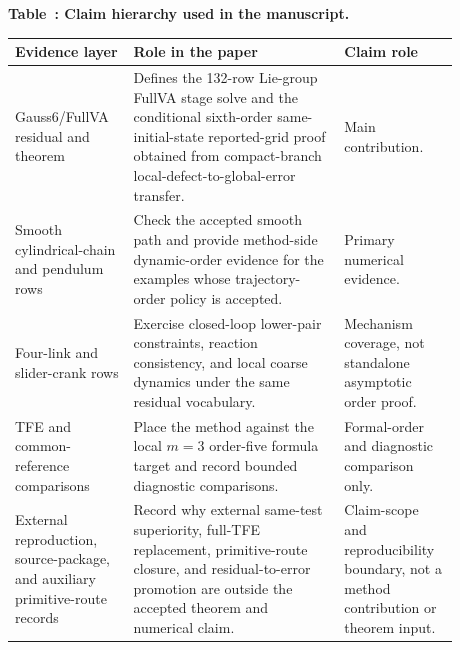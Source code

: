 \documentclass[preprint,12pt]{elsarticle}
\newcommand{\tfe}{TFE}
\begin{document}
\begin{center}
\label{tab:intro-claim-hierarchy}
\small
\textbf{Table~\thetable: Claim hierarchy used in the manuscript.}\par\vspace{0.5em}
\begin{tabular}{P{0.23\linewidth}P{0.43\linewidth}P{0.22\linewidth}}
\toprule
Evidence layer & Role in the paper & Claim role \\
\midrule
Gauss6/FullVA residual and theorem &
Defines the 132-row Lie-group FullVA stage solve and the conditional
sixth-order same-initial-state reported-grid proof obtained from
compact-branch local-defect-to-global-error transfer. &
Main contribution. \\
Smooth cylindrical-chain and pendulum rows &
Check the accepted smooth path and provide method-side dynamic-order evidence
for the examples whose trajectory-order policy is accepted. &
Primary numerical evidence. \\
Four-link and slider-crank rows &
Exercise closed-loop lower-pair constraints, reaction consistency, and local
coarse dynamics under the same residual vocabulary. &
Mechanism coverage, not standalone asymptotic order proof. \\
\tfe{} and common-reference comparisons &
Place the method against the local \(m=3\) order-five formula target and
record bounded diagnostic comparisons. &
Formal-order and diagnostic comparison only. \\
External reproduction, source-package, and auxiliary primitive-route records &
Record why external same-test superiority, full-\tfe{} replacement,
primitive-route closure, and residual-to-error promotion are outside the
accepted theorem and numerical claim. &
Claim-scope and reproducibility boundary, not a method contribution or theorem
input. \\
\bottomrule
\end{tabular}
\end{center}
\end{document}
